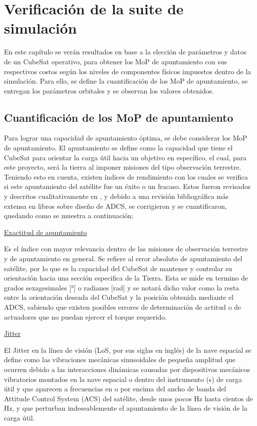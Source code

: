 \section{Verificación de la suite de simulación}

En este capítulo se verán resultados en base a la elección de parámetros y datos de un CubeSat operativo, para obtener los MoP de apuntamiento con sus respectivos costos según los niveles de componentes físicos impuestos dentro de la simulación. Para ello, se define la cuantificación de los MoP de apuntamiento, se entregan los parámetros orbitales y se observan los valores obtenidos.

\subsection{Cuantificación de los MoP de apuntamiento}

Para lograr una capacidad de apuntamiento óptima, se debe considerar los MoP de apuntamiento. El apuntamiento se define como la capacidad que tiene el CubeSat para orientar la carga útil hacia un objetivo en específico, el cual, para este proyecto, será la tierra al imponer misiones del tipo observación terrestre. Teniendo esto en cuenta, existen índices de rendimiento con los cuales se verifica si este apuntamiento del satélite fue un éxito o un fracaso. Estos fueron revisados y descritos cualitativamente en \cite{ref6}, y debido a una revisión bibliográfica más extensa en libros sobre diseño de ADCS, se corrigieron y se cuantificaron, quedando como se muestra a continuación:

\underline{Exactitud de apuntamiento \cite{ref5,ref7}}

Es el índice con mayor relevancia dentro de las misiones de observación terrestre y de apuntamiento en general. Se refiere al error absoluto de apuntamiento del satélite, por lo que es la capacidad del CubeSat de mantener y controlar su orientación hacia una sección especifica de la Tierra. Esta se mide en termino de grados sexagesimales [°] o radianes [rad] y se notará dicho valor como la resta entre la orientación deseada del CubeSat y la posición obtenida mediante el ADCS, sabiendo que existen posibles errores de determinación de actitud o de actuadores que no puedan ejercer el torque requerido.

\underline{Jitter \cite{ref5,ref9,ref10}}

El Jitter en la línea de visión (LoS, por sus siglas en inglés) de la nave espacial se define como las vibraciones mecánicas sinusoidales de pequeña amplitud que ocurren debido a las interacciones dinámicas causadas por dispositivos mecánicos vibratorios montados en la nave espacial o dentro del instrumento (s) de carga útil y que aparecen a frecuencias en o por encima del ancho de banda del Attitude Control System (ACS) del satélite, desde unos pocos Hz hasta cientos de Hz, y que perturban indeseablemente el apuntamiento de la línea de visión de la carga útil. 

